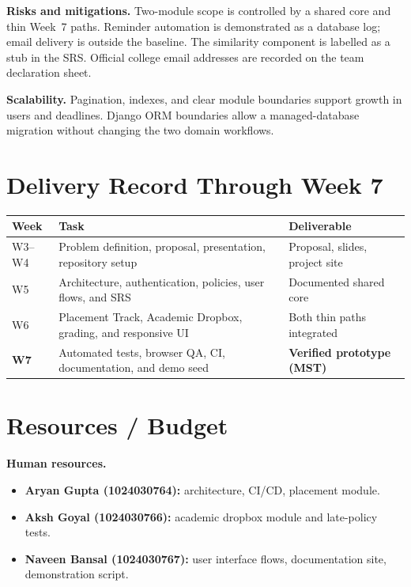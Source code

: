\documentclass[11pt,a4paper]{article}
\begin{document}
\textbf{Risks and mitigations.}
Two-module scope is controlled by a shared core and thin Week~7 paths.
Reminder automation is demonstrated as a database log; email delivery is
outside the baseline. The similarity component is labelled as a stub in the
SRS. Official college email addresses are recorded on the team declaration
sheet.

\textbf{Scalability.}
Pagination, indexes, and clear module boundaries support growth in users and
deadlines. Django ORM boundaries allow a managed-database migration without
changing the two domain workflows.

\section{Delivery Record Through Week 7}

\begin{center}
\small
\begin{tabular}{@{}p{1.6cm}>{\raggedright\arraybackslash}p{6.2cm}>{\raggedright\arraybackslash}p{5.0cm}@{}}
\toprule
\textbf{Week} & \textbf{Task} & \textbf{Deliverable} \\
\midrule
W3--W4 & Problem definition, proposal, presentation, repository setup &
  Proposal, slides, project site \\
W5 & Architecture, authentication, policies, user flows, and SRS &
  Documented shared core \\
W6 & Placement Track, Academic Dropbox, grading, and responsive UI &
  Both thin paths integrated \\
\textbf{W7} & Automated tests, browser QA, CI, documentation, and demo seed &
  \textbf{Verified prototype (MST)} \\
\bottomrule
\end{tabular}
\end{center}

\section{Resources / Budget}

\textbf{Human resources.}
\begin{itemize}[leftmargin=0.7cm,itemsep=1pt]
  \item \textbf{Aryan Gupta (1024030764):} architecture, CI/CD, placement
        module.
  \item \textbf{Aksh Goyal (1024030766):} academic dropbox module and late-policy
        tests.
  \item \textbf{Naveen Bansal (1024030767):} user interface flows,
        documentation site, demonstration script.
\end{itemize}
\end{document}
